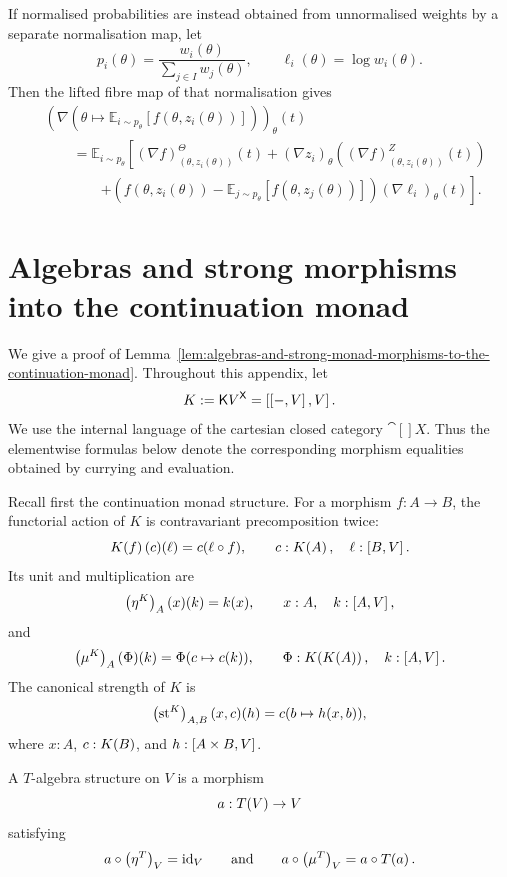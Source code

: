 \documentclass[11pt,a4paper]{article}
\theoremstyle{definition}
\theoremstyle{remark}
\providecommand{\id}{\mathrm{id}}
\providecommand{\blankdash}{\mathord{-}}
\providecommand{\cont}{\mathsf{K}}
\providecommand{\str}{\operatorname{st}}
\begin{document}
If normalised probabilities are instead obtained from unnormalised
weights by a separate normalisation map, let
\[
  p_i(\theta)=\frac{w_i(\theta)}{\sum_{j\in I}w_j(\theta)},
  \qquad
  \ell_i(\theta)=\log w_i(\theta).
\]
Then the lifted fibre map of that normalisation gives
\[
  \begin{aligned}
  &
  \left( 
    \nabla (\theta\mapsto 
    \mathbb E_{i\sim p_\theta}
    \left[
      f(\theta,z_i(\theta))
    \right])
  \right)_\theta(t)
  \\
  &\qquad =
  \mathbb E_{i\sim p_\theta}
  \left[
    (\nabla f)^\Theta_{(\theta,z_i(\theta))}(t)
    +
    (\nabla z_i)_\theta
    \left(
      (\nabla f)^Z_{(\theta,z_i(\theta))}(t)
    \right)
  \right.
  \\
  &\qquad\qquad\left.
    +
    \left(
      f(\theta,z_i(\theta))
      -
      \mathbb E_{j\sim p_\theta}
      [f(\theta,z_j(\theta))]
    \right)
    (\nabla\ell_i)_\theta(t)
  \right].
  \end{aligned}
\]



\section{Algebras and strong morphisms into the continuation monad}
\label{sec:appendix-algebras-and-continuations}

We give a proof of
Lemma~\ref{lem:algebras-and-strong-monad-morphisms-to-the-continuation-monad}.
Throughout this appendix, let
\[
  K := \cont{V}^{\cat[]{X}} = \inthom{\inthom{\blankdash}{V}}{V}.
\]
We use the internal language of the cartesian closed category
\(\cat[]{X}\).  Thus the elementwise formulas below denote the
corresponding morphism equalities obtained by currying and evaluation.

Recall first the continuation monad structure.  For a morphism
\(f:A\to B\), the functorial action of \(K\) is contravariant
precomposition twice:
\[
  \Fun{K}{f}(c)(\ell)=c(\ell\circ f),
  \qquad
  c:\Fun{K}{A},
  \quad
  \ell:\inthom{B}{V}.
\]
Its unit and multiplication are
\[
  \Nat{\eta^{K}}{A}(x)(k)=k(x),
  \qquad
  x:A,
  \quad
  k:\inthom{A}{V},
\]
and
\[
  \Nat{\mu^{K}}{A}(\Phi)(k)
  =
  \Phi(c\mapsto c(k)),
  \qquad
  \Phi:\Fun{K}{\Fun{K}{A}},
  \quad
  k:\inthom{A}{V}.
\]
The canonical strength of \(K\) is
\[
  \Nat{\str^{K}}{A,B}(x,c)(h)
  =
  c(b\mapsto h(x,b)),
\]
where \(x:A\), \(c:\Fun{K}{B}\), and
\(h:\left[A\times B,V\right]\).

A \(T\)-algebra structure on \(V\) is a morphism
\[
  a:\Fun{T}{V}\to V
\]
satisfying
\[
  a\circ\Nat{\eta^{T}}{V}=\id_{V}
  \qquad
  \text{and}
  \qquad
  a\circ\Nat{\mu^{T}}{V}
  =
  a\circ\Fun{T}{a}.
\]
\end{document}
